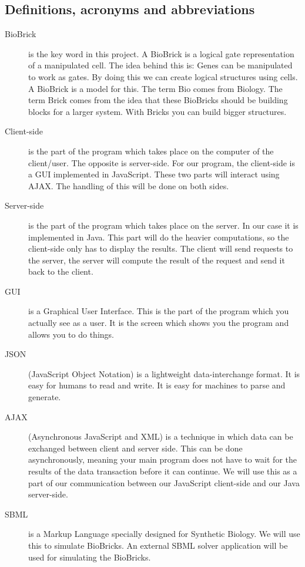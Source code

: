\documentclass[a4paper]{article}
\begin{document}
\subsection{Definitions, acronyms and abbreviations}
\begin{description}
	\item[BioBrick] is the key word in this project. A BioBrick is a logical gate representation of a manipulated cell. The idea behind this is: Genes can be manipulated to work as gates. By doing this we can create logical structures using cells. A BioBrick is a model for this. The term Bio comes from Biology. The term Brick comes from the idea that these BioBricks should be building blocks for a larger system. With Bricks you can build bigger structures.  
	\item[Client-side] is the part of the program which takes place on the computer of the client/user. The opposite is server-side. For our program, the client-side is a GUI implemented in JavaScript. These two parts will interact using AJAX. The handling of this will be done on both sides. 
	\item[Server-side]  is the part of the program which takes place on the server. In our case it is implemented in Java. This part will do the heavier computations, so the client-side only has to display the results. The client will send requests to the server, the server will compute the result of the request and send it back to the client.
	\item[GUI] is a Graphical User Interface. This is the part of the program which you actually see as a user. It is the screen which shows you the program and allows you to do things. 
	\item[JSON] (JavaScript Object Notation) is a lightweight data-interchange format. It is easy for humans to read and write. It is easy for machines to parse and generate.
	\item[AJAX] (Asynchronous JavaScript and XML) is a technique in which data can be exchanged between client and server side. This can be done asynchronously, meaning your main program does not have to wait for the results of the data transaction before it can continue. We will use this as a part of our communication between our JavaScript client-side and our Java server-side.
	\item[SBML] is a Markup Language specially designed for Synthetic Biology. We will use this to simulate BioBricks. An external SBML solver application will be used for simulating the BioBricks.
\end{description}
\end{document}
